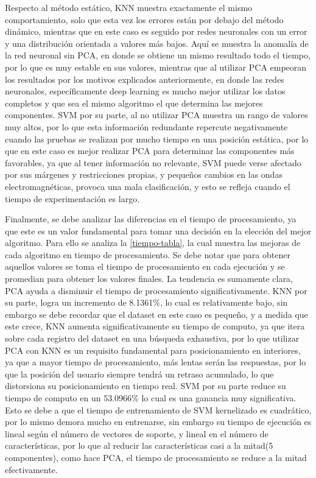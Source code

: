 Respecto al método estático, KNN muestra exactamente el mismo comportamiento, solo que esta vez los errores están por debajo del método dinámico, mientras que en este caso es seguido por redes neuronales con un error y una distribución orientada a valores más bajos. Aquí se muestra la anomalía de la red neuronal sin PCA, en donde se obtiene un mismo resultado todo el tiempo, por lo que es muy estable en sus valores, mientras que al utilizar PCA empeoran los resultados por los motivos explicados anteriormente, en donde las redes neuronales, específicamente deep learning es mucho mejor utilizar los datos completos y que sea el mismo algoritmo el que determina las mejores componentes. SVM por su parte, al no utilizar PCA muestra un rango de valores muy altos, por lo que esta información redundante repercute negativamente cuando las pruebas se realizan por mucho tiempo en una posición estática, por lo que en este caso es mejor realizar PCA para determinar las componentes más favorables, ya que al tener información no relevante, SVM puede verse afectado por sus márgenes y restricciones propias, y pequeños cambios en las ondas electromagnéticas, provoca una mala clasificación, y esto se refleja cuando el tiempo de experimentación es largo.

Finalmente, se debe analizar las diferencias en el tiempo de procesamiento, ya que este es un valor fundamental para tomar una decisión en la elección del mejor algoritmo. Para ello se analiza la \autoref{tiempo-tabla}, la cual muestra las mejoras de cada algoritmo en tiempo de procesamiento. Se debe notar que para obtener aquellos valores se toma el tiempo de procesamiento en cada ejecución y se promedian para obtener los valores finales. La tendencia es sumamente clara, PCA ayuda a disminuir el tiempo de procesamiento significativamente. KNN por su parte, logra un incremento de 8.1361\%, lo cual es relativamente bajo, sin embargo se debe recordar que el dataset en este caso es pequeño, y a medida que este crece, KNN aumenta significativamente su tiempo de computo, ya que itera sobre cada registro del dataset en una búsqueda exhaustiva, por lo que utilizar PCA con KNN es un requisito fundamental para posicionamiento en interiores, ya que a mayor tiempo de procesamiento, más lentas serán las respuestas, por lo que la posición del usuario siempre tendrá un retraso acumulado, lo que distorsiona su posicionamiento en tiempo real. SVM por su parte reduce su tiempo de computo en un 53.0966\% lo cual es una ganancia muy significativa. Esto se debe a que el tiempo de entrenamiento de SVM kernelizado es cuadrático, por lo mismo demora mucho en entrenarse, sin embargo su tiempo de ejecución es lineal según el número de vectores de soporte, y lineal en el número de características, por lo que al reducir las características casi a la mitad(5 componentes), como hace PCA, el tiempo de procesamiento se reduce a la mitad efectivamente.

